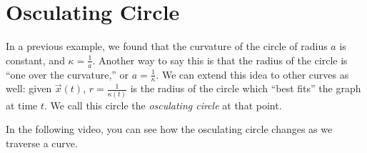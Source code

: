 \documentclass{ximera}
\begin{document}
\section*{Osculating Circle}

In a previous example, we found that the curvature of the circle of radius $a$ is constant, and $\kappa = \frac{1}{a}$. Another way to say this is that the radius of the circle is ``one over the curvature,'' or $a = \frac{1}{\kappa}$. We can extend this idea to other curves as well: given $\vec{x}(t)$, $r = \frac{1}{\kappa(t)}$ is the radius of the circle which ``best fits'' the graph at time $t$. We call this circle the \emph{osculating circle} at that point.

In the following video, you can see how the osculating circle changes as we traverse a curve.

\end{document}
